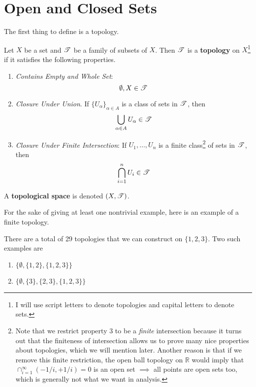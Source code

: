 \section{Open and Closed Sets} 

  The first thing to define is a topology. 

  \begin{definition}[Topology]
    Let $X$ be a set and $\operatorname{\mathscr{T}}$ be a family of subsets of $X$. Then $\operatorname{\mathscr{T}}$ is a \textbf{topology} on $X$\footnote{I will use script letters to denote topologies and capital letters to denote sets.} if it satisfies the following properties. 
    \begin{enumerate}
      \item \textit{Contains Empty and Whole Set}: 
      \begin{equation}
        \emptyset, X \in \operatorname{\mathscr{T}}
      \end{equation}

      \item \textit{Closure Under Union}. If $\{U_\alpha\}_{\alpha \in A}$ is a class of sets in $\operatorname{\mathscr{T}}$, then 
      \begin{equation}
        \bigcup_{\alpha \in A} U_\alpha \in \operatorname{\mathscr{T}}
      \end{equation}

      \item \textit{Closure Under Finite Intersection}: If $U_1, \ldots, U_n$ is a finite class\footnote{Note that we restrict property 3 to be a \textit{finite} intersection because it turns out that the finiteness of intersection allows us to prove many nice properties about topologies, which we will mention later. Another reason is that if we remove this finite restriction, the open ball topology on $\mathbb{R}$ would imply that $\cap_{i = 1}^{\infty} ( - 1/i, +1/i ) = 0$ is an open set $\implies$ all points are open sets too, which is generally not what we want in analysis. 
      } of sets in $\operatorname{\mathscr{T}}$, then 
      \begin{equation}
       \bigcap_{i=1}^{n} U_i \in \operatorname{\mathscr{T}}
      \end{equation}
    \end{enumerate}
    A \textbf{topological space} is denoted $(X, \operatorname{\mathscr{T}})$. 
  \end{definition}

  For the sake of giving at least one nontrivial example, here is an example of a finite topology. 

  \begin{example}
    There are a total of 29 topologies that we can construct on $\{1, 2, 3\}$. Two such examples are 
    \begin{enumerate}
      \item $\{\emptyset, \{1, 2\}, \{1, 2, 3\}\}$ 
      \item $\{\emptyset, \{3\}, \{2, 3\}, \{1, 2, 3\}\}$
    \end{enumerate}
  \end{example} 

